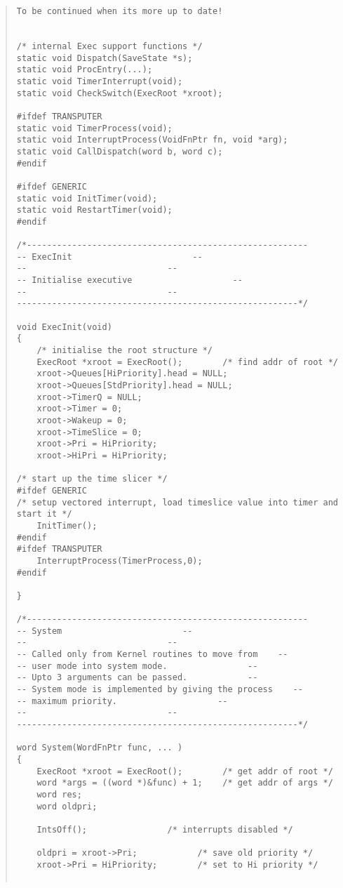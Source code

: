\begin {quote}
\begin{verbatim}
To be continued when its more up to date!


/* internal Exec support functions */
static void Dispatch(SaveState *s);
static void ProcEntry(...);
static void TimerInterrupt(void);
static void CheckSwitch(ExecRoot *xroot);

#ifdef TRANSPUTER
static void TimerProcess(void);
static void InterruptProcess(VoidFnPtr fn, void *arg);
static void CallDispatch(word b, word c);
#endif

#ifdef GENERIC
static void InitTimer(void);
static void RestartTimer(void);
#endif

/*--------------------------------------------------------
-- ExecInit                        --
--                            --
-- Initialise executive                    --
--                            --
--------------------------------------------------------*/

void ExecInit(void)
{
    /* initialise the root structure */
    ExecRoot *xroot = ExecRoot();        /* find addr of root */
    xroot->Queues[HiPriority].head = NULL;
    xroot->Queues[StdPriority].head = NULL;
    xroot->TimerQ = NULL;    
    xroot->Timer = 0;
    xroot->Wakeup = 0;
    xroot->TimeSlice = 0;
    xroot->Pri = HiPriority;
    xroot->HiPri = HiPriority;

/* start up the time slicer */
#ifdef GENERIC
/* setup vectored interrupt, load timeslice value into timer and start it */
    InitTimer();
#endif
#ifdef TRANSPUTER
    InterruptProcess(TimerProcess,0);
#endif

}

/*--------------------------------------------------------
-- System                        --
--                            --
-- Called only from Kernel routines to move from    --
-- user mode into system mode.                --
-- Upto 3 arguments can be passed.            --
-- System mode is implemented by giving the process    --
-- maximum priority.                    --
--                            --
--------------------------------------------------------*/

word System(WordFnPtr func, ... )
{
    ExecRoot *xroot = ExecRoot();        /* get addr of root */
    word *args = ((word *)&func) + 1;    /* get addr of args */
    word res;
    word oldpri;

    IntsOff();                /* interrupts disabled */

    oldpri = xroot->Pri;            /* save old priority */
    xroot->Pri = HiPriority;        /* set to Hi priority */


\end{verbatim}
\end{quote}
